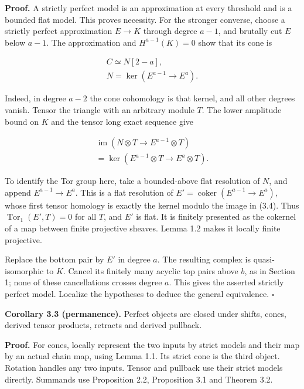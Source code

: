 \documentclass[
  english,
  11pt,
  a4paper,
]{article}
\begin{document}
\textbf{Proof.} A strictly perfect model is an approximation at every
threshold and is a bounded flat model. This proves necessity. For the
stronger converse, choose a strictly perfect approximation \(E\to K\)
through degree \(a-1\), and brutally cut \(E\) below \(a-1\). The
approximation and \(H^{a-1}(K)=0\) show that its cone is

\[\begin{gathered}
C\simeq N[2-a],\\
N=\ker(E^{a-1}\to E^a).
\end{gathered}
\tag{3.3}\]

Indeed, in degree \(a-2\) the cone cohomology is that kernel, and all
other degrees vanish. Tensor the triangle with an arbitrary module
\(T\). The lower amplitude bound on \(K\) and the tensor long exact
sequence give

\[\begin{gathered}
\operatorname{im}(N\otimes T\to E^{a-1}\otimes T)\\
=\ker(E^{a-1}\otimes T\to E^a\otimes T).
\end{gathered}
\tag{3.4}\]

To identify the Tor group here, take a bounded-above flat resolution of
\(N\), and append \(E^{a-1}\to E^a\). This is a flat resolution of
\(E'=\operatorname{coker}(E^{a-1}\to E^a)\), whose first tensor homology
is exactly the kernel modulo the image in (3.4). Thus
\(\operatorname{Tor}_1(E',T)=0\) for all \(T\), and \(E'\) is flat. It
is finitely presented as the cokernel of a map between finite projective
sheaves. Lemma 1.2 makes it locally finite projective.

Replace the bottom pair by \(E'\) in degree \(a\). The resulting complex
is quasi-isomorphic to \(K\). Cancel its finitely many acyclic top pairs
above \(b\), as in Section 1; none of these cancellations crosses degree
\(a\). This gives the asserted strictly perfect model. Localize the
hypotheses to deduce the general equivalence. \(\square\)

\textbf{Corollary 3.3 (permanence).} Perfect objects are closed under
shifts, cones, derived tensor products, retracts and derived pullback.

\textbf{Proof.} For cones, locally represent the two inputs by strict
models and their map by an actual chain map, using Lemma 1.1. Its strict
cone is the third object. Rotation handles any two inputs. Tensor and
pullback use their strict models directly. Summands use Proposition 2.2,
Proposition 3.1 and Theorem 3.2.
\end{document}

